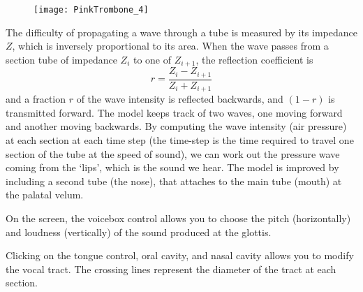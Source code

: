 \begin{figure}[h]
\centering
\texttt{[image: PinkTrombone\_4]}
\end{figure}

The difficulty of propagating a wave through a tube is measured by its impedance $Z$, which is inversely proportional to its area. When the wave passes from a section tube of impedance $Z_i$ to one of $Z_{i+1}$, the reflection coefficient is
$$r=\frac{Z_i - Z_{i+1}}{Z_i + Z_{i+1}}$$
and a fraction $r$ of the wave intensity is reflected backwards, and $(1-r)$ is transmitted forward. The model keeps track of two waves, one moving forward and another moving backwards. By computing the wave intensity (air pressure) at each section at each time step (the time-step is the time required to travel one section of the tube at the speed of sound), we can work out the pressure wave coming from the `lips', which is the sound we hear. The model is improved by including a second tube (the nose), that attaches to the main tube (mouth) at the palatal velum.

On the screen, the voicebox control allows you to choose the pitch (horizontally) and loudness (vertically) of the sound produced at the glottis. 

Clicking on the tongue control, oral cavity, and nasal cavity allows you to modify the vocal tract. The crossing lines represent the diameter of the tract at each section.

